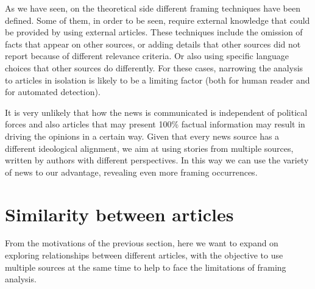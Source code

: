 As we have seen, on the theoretical side different framing techniques have been defined. Some of them, in order to be seen, require external knowledge that could be provided by using external articles.
These techniques include the omission of facts that appear on other sources, or adding details that other sources did not report because of different relevance criteria.
Or also using specific language choices that other sources do differently.
For these cases, narrowing the analysis to articles in isolation %
is likely to be a limiting factor (both for human reader and for automated detection).

It is very unlikely that how the news is communicated is independent of political forces and also articles that may present 100\% factual information may result in driving the opinions in a certain way.
Given that every news source has a different ideological alignment, we aim at using stories from multiple sources, written by authors with different perspectives.
In this way we can use the variety of news to our advantage, revealing even more framing occurrences.





\section{Similarity between articles}
\label{sec:lit_relationships}

From the motivations of the previous section, here we want to expand on exploring relationships between different articles, with the objective to use multiple sources at the same time to help to face the limitations of framing analysis.


